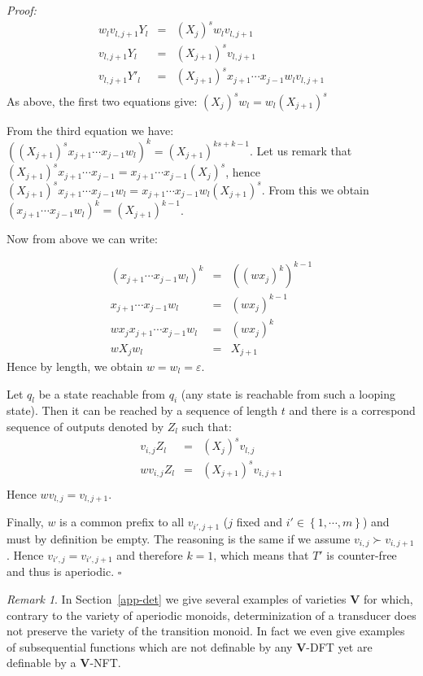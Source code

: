 \documentclass[12pt]{report}
\theoremstyle{definition}
\theoremstyle{remark}
\newtheorem{rmk}{Remark}[section]
\newenvironment{prf}
{\textit{Proof:}}
{\hfill $\square$\\}
\begin{document}
\begin{prf}
$$\begin{array}{rcl} 
w_lv_{l,j+1}Y_l&=&(X_j)^sw_lv_{l,j+1}\\
v_{l,j+1}Y_l&=&(X_{j+1})^sv_{l,j+1}\\
v_{l,j+1}Y'_l&=&(X_{j+1})^{s}x_{j+1}\cdots x_{j-1} w_lv_{l,j+1}\\
\end{array}$$
As above, the first two equations give:
$(X_j)^sw_l=w_l(X_{j+1})^s$

From the third equation we have:
$((X_{j+1})^sx_{j+1}\cdots x_{j-1} w_l)^k=(X_{j+1})^{ks+k-1}$. Let us remark that $(X_{j+1})^sx_{j+1}\cdots x_{j-1}=x_{j+1}\cdots x_{j-1}(X_j)^s$, hence $(X_{j+1})^sx_{j+1}\cdots x_{j-1} w_l=x_{j+1}\cdots x_{j-1}w_l(X_{j+1})^s$. From this we obtain $(x_{j+1}\cdots x_{j-1} w_l)^k=(X_{j+1})^{k-1}$.

Now from above we can write:

$$\begin{array}{rcl}
(x_{j+1}\cdots x_{j-1} w_l)^k&=&((wx_j)^k)^{k-1}\\
x_{j+1}\cdots x_{j-1} w_l&=&(wx_j)^{k-1}\\
wx_jx_{j+1}\cdots x_{j-1} w_l&=&(wx_j)^k\\
wX_jw_l&=&X_{j+1}
\end{array}$$
Hence by length, we obtain $w=w_l=\varepsilon$.

Let $q_l$ be a state reachable from $q_i$ (any state is reachable from such a looping state). Then it can be reached by a sequence of length $t$ and there is a correspond sequence of outputs denoted by $Z_l$ such that:
$$\begin{array}{rcl} 
v_{i,j}Z_l&=&(X_j)^sv_{l,j}\\
wv_{i,j}Z_l&=&(X_{j+1})^sv_{i,j+1}\\
\end{array}$$
Hence $wv_{l,j}=v_{l,j+1}$.

Finally, $w$ is a common prefix to all $v_{i',j+1}$ ($j$ fixed and $i'\in \left\{1,\cdots,m\right\}$) and must by definition be empty. The reasoning is the same if we assume $v_{i,j}\succ v_{i,j+1}$. Hence $v_{i',j}=v_{i',j+1}$ and therefore $k=1$, which means that $T'$ is counter-free and thus is aperiodic.
\end{prf}

\begin{rmk}
In Section~\ref{app-det} we give several examples of varieties \textbf V for which, contrary to the variety of aperiodic monoids, determinization of a transducer does not preserve the variety of the transition monoid.
In fact we even give examples of subsequential functions which are not definable by any \textbf V-DFT yet are definable by a \textbf V-NFT.
\end{rmk}
\end{document}
